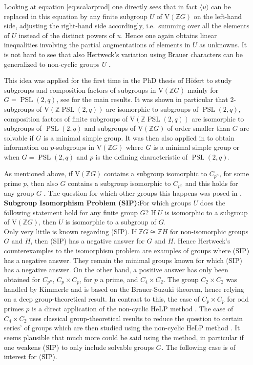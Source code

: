\documentclass[10pt,a4paper,reqno]{amsart}
\theoremstyle{definition}
\theoremstyle{remark}
\newcommand{\PSL}{\operatorname{PSL}}
\newcommand{\V}{\mathrm{V}}
\newcommand{\ZZ}{\mathbb{Z}}
\begin{document}
Looking at equation \eqref{eq:scalarprod} one directly sees that in fact $\langle u \rangle$ can be replaced in this equation by any finite subgroup $U$ of $\V(\ZZ G)$ on the left-hand side, adjusting the right-hand side accordingly, i.e.\ summing over all the elements of $U$ instead of the distinct powers of $u$. Hence one again obtains linear inequalities involving the partial augmentations of elements in $U$ as unknowns. It is not hard to see that also Hertweck's variation using Brauer characters can be generalized to non-cyclic groups $U$ \cite[Lemma 2.2]{Mar17}.

This idea was applied for the first time in the PhD thesis of H\"ofert \cite{HoefertDoktor} to study subgroups and composition factors of subgroups in $\V(\ZZ G)$ mainly for $G = \PSL(2,q)$, see \cite{HHK09} for the main results. It was shown in particular that $2$-subgroups of $\V(\ZZ \PSL(2,q))$ are isomorphic to subgroups of $\PSL(2,q)$, composition factors of finite subgroups of $\V(\ZZ \PSL(2,q))$ are isomorphic to subgroups of $\PSL(2,q)$ and subgroups of $\V(\ZZ G)$ of order smaller than $G$ are solvable if $G$ is a minimal simple group. It was then also applied in \cite{BK11, BM15} to obtain information on $p$-subgroups in $\V(\ZZ G)$ where $G$ is a minimal simple group or when $G = \PSL(2,q)$ and $p$ is the defining characteristic of $\PSL(2,q)$.

As mentioned above, if $\V(\ZZ G)$ contains a subgroup isomorphic to $C_{p^n}$, for some prime $p$, then also $G$ contains a subgroup isomorphic to $C_{p^n}$ and this holds for any group $G$ \cite{CL65}. The question for which other groups this happens was posed in \cite[Problem~19]{JMNK07}. \\

\noindent\textbf{Subgroup Isomorphism Problem (SIP):}\quad For which groups $U$ does the following statement hold for any finite group $G$? If $U$ is isomorphic to a subgroup of $\V(\ZZ G)$, then $U$ is isomorphic to a subgroup of $G$.\\

Only very little is known regarding (SIP). If $\ZZ G \cong \ZZ H$ for non-isomorphic groups $G$ and $H$, then (SIP) has a negative answer for $G$ and $H$. Hence Hertweck's counterexamples to the isomorphism problem \cite{Her01} are examples of groups where (SIP) has a negative answer. They remain the minimal groups known for which (SIP) has a negative answer. On the other hand, a positive answer has only been obtained for $C_{p^n}$, $C_p \times C_p$, for $p$ a prime, and $C_4 \times C_2$. The group $C_2 \times C_2$ was handled by Kimmerle \cite{JMNK07} and is based on the Brauer-Suzuki theorem, hence relying on a deep group-theoretical result. In contrast to this, the case of $C_p \times C_p$ for odd primes $p$ is a direct application of the non-cyclic HeLP method \cite{HertweckCpCp}. The case of $C_4 \times C_2$ uses classical group-theoretical results to reduce the question to certain series' of groups which are then studied using the non-cyclic HeLP method \cite{Mar17}. It seems plausible that much more could be said using the method, in particular if one weakens (SIP) to only include solvable groups $G$. The following case is of interest for (SIP).
\end{document}
